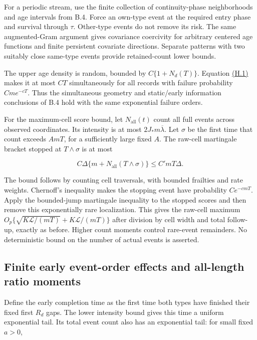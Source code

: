 \documentclass[11pt]{article}
\begin{document}
For a periodic stream, use the finite collection of continuity-phase neighborhoods and age intervals from B.4. Force an own-type event at the required entry phase and survival through \(\tau\). Other-type events do not remove its risk. The same augmented-Gram argument gives covariance coercivity for arbitrary centered age functions and finite persistent covariate directions. Separate patterns with two suitably close same-type events provide retained-count lower bounds.

The upper age density is random, bounded by \(C\{1+N_d(T)\}\). Equation \hyperref[eq:H.1]{(H.1)} makes it at most \(CT\) simultaneously for all records with failure probability \(Cm e^{-cT}\). Thus the simultaneous geometry and static/early information conclusions of B.4 hold with the same exponential failure orders.

For the maximum-cell score bound, let \(N_{\mathrm{all}}(t)\) count all full events across observed coordinates. Its intensity is at most \(2J_*m\overline\lambda\). Let \(\sigma\) be the first time that count exceeds \(A mT\), for a sufficiently large fixed \(A\). The raw-cell martingale bracket stopped at \(T\wedge\sigma\) is at most

\begin{equation*}
C\Delta\{m+N_{\mathrm{all}}(T\wedge\sigma)\}\leq C' mT\Delta .
\tag{H.8}\label{eq:H.8}
\end{equation*}

The bound follows by counting cell traversals, with bounded frailties and rate weights. Chernoff's inequality makes the stopping event have probability \(Ce^{-c mT}\). Apply the bounded-jump martingale inequality to the stopped scores and then remove this exponentially rare localization. This gives the raw-cell maximum
\(O_p\{\sqrt{K\mathscr L/(mT)}+K\mathscr L/(mT)\}\)
after division by cell width and total follow-up, exactly as before. Higher count moments control rare-event remainders. No deterministic bound on the number of actual events is asserted.

\subsection{Finite early event-order effects and all-length ratio moments}\label{sec:H.5}

Define the early completion time as the first time both types have finished their fixed first \(R_d\) gaps. The lower intensity bound gives this time a uniform exponential tail. Its total event count also has an exponential tail: for small fixed \(a>0\),
\end{document}
